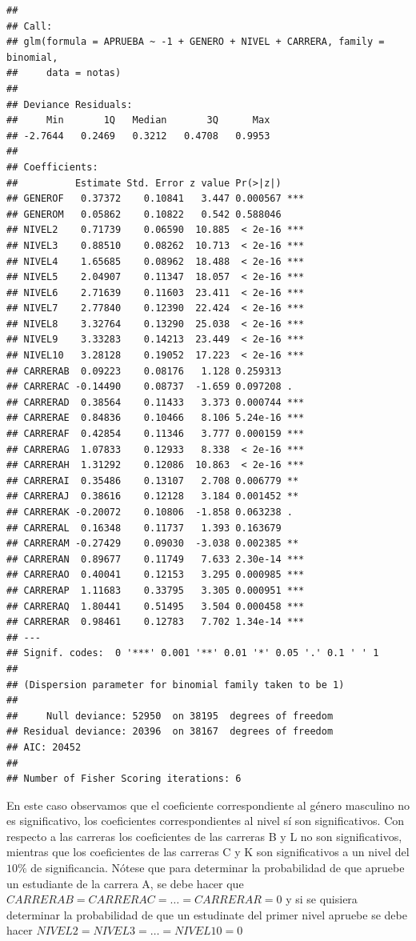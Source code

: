 \documentclass[
]{krantz}
\begin{document}
\begin{verbatim}
## 
## Call:
## glm(formula = APRUEBA ~ -1 + GENERO + NIVEL + CARRERA, family = binomial, 
##     data = notas)
## 
## Deviance Residuals: 
##     Min       1Q   Median       3Q      Max  
## -2.7644   0.2469   0.3212   0.4708   0.9953  
## 
## Coefficients:
##          Estimate Std. Error z value Pr(>|z|)    
## GENEROF   0.37372    0.10841   3.447 0.000567 ***
## GENEROM   0.05862    0.10822   0.542 0.588046    
## NIVEL2    0.71739    0.06590  10.885  < 2e-16 ***
## NIVEL3    0.88510    0.08262  10.713  < 2e-16 ***
## NIVEL4    1.65685    0.08962  18.488  < 2e-16 ***
## NIVEL5    2.04907    0.11347  18.057  < 2e-16 ***
## NIVEL6    2.71639    0.11603  23.411  < 2e-16 ***
## NIVEL7    2.77840    0.12390  22.424  < 2e-16 ***
## NIVEL8    3.32764    0.13290  25.038  < 2e-16 ***
## NIVEL9    3.33283    0.14213  23.449  < 2e-16 ***
## NIVEL10   3.28128    0.19052  17.223  < 2e-16 ***
## CARRERAB  0.09223    0.08176   1.128 0.259313    
## CARRERAC -0.14490    0.08737  -1.659 0.097208 .  
## CARRERAD  0.38564    0.11433   3.373 0.000744 ***
## CARRERAE  0.84836    0.10466   8.106 5.24e-16 ***
## CARRERAF  0.42854    0.11346   3.777 0.000159 ***
## CARRERAG  1.07833    0.12933   8.338  < 2e-16 ***
## CARRERAH  1.31292    0.12086  10.863  < 2e-16 ***
## CARRERAI  0.35486    0.13107   2.708 0.006779 ** 
## CARRERAJ  0.38616    0.12128   3.184 0.001452 ** 
## CARRERAK -0.20072    0.10806  -1.858 0.063238 .  
## CARRERAL  0.16348    0.11737   1.393 0.163679    
## CARRERAM -0.27429    0.09030  -3.038 0.002385 ** 
## CARRERAN  0.89677    0.11749   7.633 2.30e-14 ***
## CARRERAO  0.40041    0.12153   3.295 0.000985 ***
## CARRERAP  1.11683    0.33795   3.305 0.000951 ***
## CARRERAQ  1.80441    0.51495   3.504 0.000458 ***
## CARRERAR  0.98461    0.12783   7.702 1.34e-14 ***
## ---
## Signif. codes:  0 '***' 0.001 '**' 0.01 '*' 0.05 '.' 0.1 ' ' 1
## 
## (Dispersion parameter for binomial family taken to be 1)
## 
##     Null deviance: 52950  on 38195  degrees of freedom
## Residual deviance: 20396  on 38167  degrees of freedom
## AIC: 20452
## 
## Number of Fisher Scoring iterations: 6
\end{verbatim}

En este caso observamos que el coeficiente correspondiente al género masculino no es significativo, los coeficientes correspondientes al nivel sí son significativos. Con respecto a las carreras los coeficientes de las carreras B y L no son significativos, mientras que los coeficientes de las carreras C y K son significativos a un nivel del \(10\%\) de significancia. Nótese que para determinar la probabilidad de que apruebe un estudiante de la carrera A, se debe hacer que \(CARRERAB=CARRERAC=\ldots=CARRERAR=0\) y si se quisiera determinar la probabilidad de que un estudinate del primer nivel apruebe se debe hacer \(NIVEL2=NIVEL3=\ldots=NIVEL10=0\)
\end{document}
